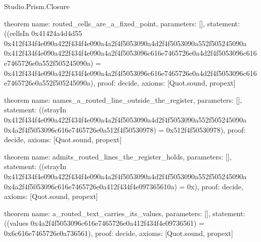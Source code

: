 \begin{lexlean}{Studio.Prism.Closure}
\begin{semanticmodule}
theorem{
  name: routed_cells_are_a_fixed_point,
  parameters: [],
  statement: ((cellsIn 0x41424a4d4d55 0x412f434f4e090a422f434f4e090a4a2f4f5053090a4d2f4f5053090a552f505245090a 0x412f434f4e090a422f434f4e090a4a2f4f5053096c616e7465726e0a4d2f4f5053096c616e7465726e0a552f505245090a) = 0x412f434f4e090a422f434f4e090a4a2f4f5053096c616e7465726e0a4d2f4f5053096c616e7465726e0a552f505245090a),
  proof: decide{},
  axioms: [Quot.sound, propext]
}

theorem{
  name: names_a_routed_line_outside_the_register,
  parameters: [],
  statement: ((strayIn 0x412f434f4e090a422f434f4e090a4a2f4f5053090a4d2f4f5053090a552f505245090a 0x4a2f4f5053096c616e7465726e0a512f4f50530978) = 0x512f4f50530978),
  proof: decide{},
  axioms: [Quot.sound, propext]
}

theorem{
  name: admits_routed_lines_the_register_holds,
  parameters: [],
  statement: ((strayIn 0x412f434f4e090a422f434f4e090a4a2f4f5053090a4d2f4f5053090a552f505245090a 0x4a2f4f5053096c616e7465726e0a412f434f4e097365610a) = 0x),
  proof: decide{},
  axioms: [Quot.sound, propext]
}

theorem{
  name: a_routed_text_carries_its_values,
  parameters: [],
  statement: ((values 0x4a2f4f5053096c616e7465726e0a412f434f4e09736561) = 0x6c616e7465726e0a736561),
  proof: decide{},
  axioms: [Quot.sound, propext]
}
\end{semanticmodule}
\end{lexlean}
